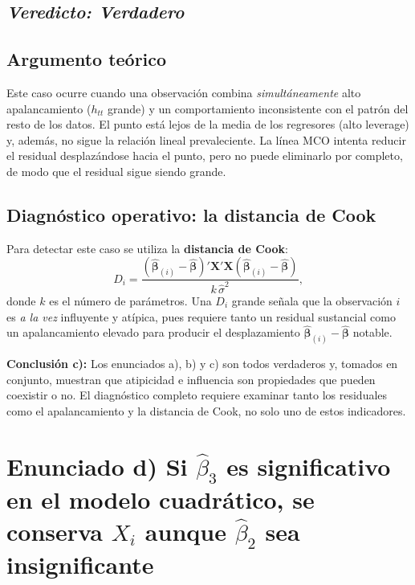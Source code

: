 \documentclass[12pt, letterpaper]{article}
\begin{document}
\subsection*{\textit{Veredicto: \textbf{Verdadero}}}

\subsection{Argumento teórico}

Este caso ocurre cuando una observación combina \emph{simultáneamente}
alto apalancamiento ($h_{tt}$ grande) y un comportamiento inconsistente
con el patrón del resto de los datos. El punto está lejos de la media
de los regresores (alto leverage) y, además, no sigue la relación lineal
prevaleciente. La línea MCO intenta reducir el residual desplazándose
hacia el punto, pero no puede eliminarlo por completo, de modo que el
residual sigue siendo grande.

\subsection{Diagnóstico operativo: la distancia de Cook}

Para detectar este caso se utiliza la \textbf{distancia de Cook}:
\begin{equation}
  D_i = \frac{(\hat{\boldsymbol{\beta}}_{(i)} - \hat{\boldsymbol{\beta}})'
              \mathbf{X}'\mathbf{X}
              (\hat{\boldsymbol{\beta}}_{(i)} - \hat{\boldsymbol{\beta}})}
             {k\,\hat{\sigma}^2},
  \label{eq:cook}
\end{equation}
donde $k$ es el número de parámetros. Una $D_i$ grande señala que la
observación $i$ es \emph{a la vez} influyente y atípica, pues requiere
tanto un residual sustancial como un apalancamiento elevado para producir
el desplazamiento $\hat{\boldsymbol{\beta}}_{(i)} - \hat{\boldsymbol{\beta}}$
notable.

\begin{clave}
  \textbf{Conclusión c):} Los enunciados a), b) y c) son todos verdaderos
  y, tomados en conjunto, muestran que atipicidad e influencia son
  propiedades que pueden coexistir o no. El diagnóstico completo requiere
  examinar tanto los residuales como el apalancamiento y la distancia
  de Cook, no solo uno de estos indicadores.
\end{clave}

\section{Enunciado d) Si $\hat{\beta}_3$ es significativo en el modelo cuadrático,
         se conserva $X_i$ aunque $\hat{\beta}_2$ sea insignificante}
\end{document}

